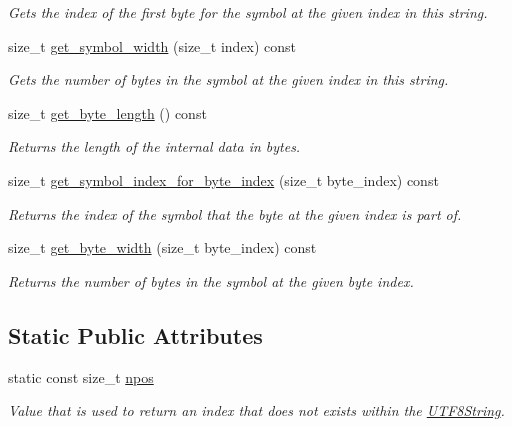 \begin{DoxyCompactItemize}
\begin{DoxyCompactList}\small\item\em Gets the index of the first byte for the symbol at the given index in this string. \end{DoxyCompactList}\item 
size\+\_\+t \hyperlink{classchaos_1_1uni_1_1_u_t_f8_string_af69ae3c678c01e516d9da2cdca745613}{get\+\_\+symbol\+\_\+width} (size\+\_\+t index) const 
\begin{DoxyCompactList}\small\item\em Gets the number of bytes in the symbol at the given index in this string. \end{DoxyCompactList}\item 
size\+\_\+t \hyperlink{classchaos_1_1uni_1_1_u_t_f8_string_ac8a4220ca85f798c27396666b2568c95}{get\+\_\+byte\+\_\+length} () const 
\begin{DoxyCompactList}\small\item\em Returns the length of the internal data in bytes. \end{DoxyCompactList}\item 
size\+\_\+t \hyperlink{classchaos_1_1uni_1_1_u_t_f8_string_a2a1f26752cfc6d5c9b14e491f2998051}{get\+\_\+symbol\+\_\+index\+\_\+for\+\_\+byte\+\_\+index} (size\+\_\+t byte\+\_\+index) const 
\begin{DoxyCompactList}\small\item\em Returns the index of the symbol that the byte at the given index is part of. \end{DoxyCompactList}\item 
size\+\_\+t \hyperlink{classchaos_1_1uni_1_1_u_t_f8_string_a7aa47a33f1886febf642c05ac51a433e}{get\+\_\+byte\+\_\+width} (size\+\_\+t byte\+\_\+index) const 
\begin{DoxyCompactList}\small\item\em Returns the number of bytes in the symbol at the given byte index. \end{DoxyCompactList}\end{DoxyCompactItemize}
\subsection*{Static Public Attributes}
\begin{DoxyCompactItemize}
\item 
\hypertarget{classchaos_1_1uni_1_1_u_t_f8_string_aa2e80695ce3d315ca62449e0a835b6a6}{}static const size\+\_\+t \hyperlink{classchaos_1_1uni_1_1_u_t_f8_string_aa2e80695ce3d315ca62449e0a835b6a6}{npos}\label{classchaos_1_1uni_1_1_u_t_f8_string_aa2e80695ce3d315ca62449e0a835b6a6}

\begin{DoxyCompactList}\small\item\em Value that is used to return an index that does not exists within the \hyperlink{classchaos_1_1uni_1_1_u_t_f8_string}{U\+T\+F8\+String}. \end{DoxyCompactList}\end{DoxyCompactItemize}


